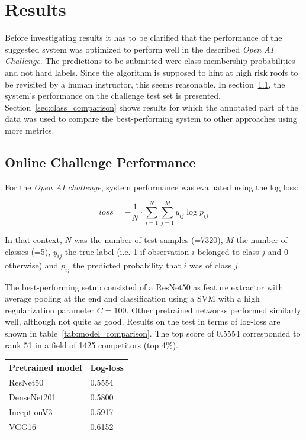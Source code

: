 \documentclass[11pt]{article}
\begin{document}
	\section{Results}
	
	Before investigating results it has to be clarified that the performance of the suggested system was optimized to perform well in the described \textit{Open AI Challenge}. The predictions to be submitted were class membership probabilities and not hard labels. Since the algorithm is supposed to hint at high risk roofs to be revisited by a human instructor, this seems reasonable. In section~\ref{sec:challenge_perf}, the system's performance on the challenge test set is presented. Section~\ref{sec:class_comparison} shows results for which the annotated part of the data was used to compare the best-performing system to other approaches using more metrics.
	
	\subsection{Online Challenge Performance}
	\label{sec:challenge_perf}
	
	For the \textit{Open AI challenge}, system performance was evaluated using the log loss:
	
	\begin{equation}
		loss = -\frac{1}{N}\cdot \sum_{i=1}^{N} \sum_{j=1}^{M}y_{ij}\log p_{ij}
		\label{eq:log_loss}
	\end{equation}
	
	In that context, $N$ was the number of test samples (=7320), $M$ the number of classes (=5), $y_{ij}$ the true label (i.e. 1 if observation $i$ belonged to class $j$ and 0 otherwise) and $p_{ij}$ the predicted probability that $i$ was of class $j$. 
	
	The best-performing setup consisted of a ResNet50 as feature extractor with average pooling at the end and classification using a SVM with a high regularization parameter $C=100$.
	Other pretrained networks performed similarly well, although not quite as good. Results on the test in terms of log-loss are shown in table~\ref{tab:model_comparison}.
	The top score of 0.5554 corresponded to rank 51 in a field of 1425 competitors (top 4\%).
	
	\begin{center}
		\bgroup
		\def\arraystretch{1.1}
		\begin{tabular}{ | m{4cm} | m{2cm} | } 
			
			\hline
			Pretrained model & Log-loss \\
			\hline
			\hline
			ResNet50 & 0.5554 \\
			\hline
			DenseNet201 & 0.5800\\
			\hline
			InceptionV3 & 0.5917\\
			\hline
			VGG16 & 0.6152\\
			\hline
		\end{tabular}
		\egroup
		\label{tab:model_comparison}
	\end{center}
	
\end{document}
